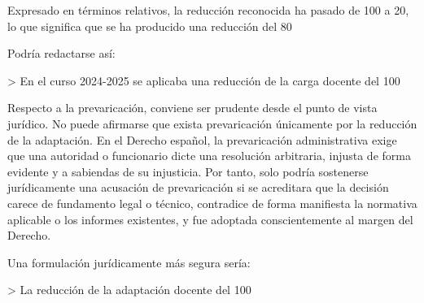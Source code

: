 \begin{itemize}[leftmargin=*, labelsep=0.6em, itemsep=0.8em]
{{{{{{{{{{Expresado en términos relativos, la reducción reconocida ha pasado de 100 a 20, lo que significa que se ha producido una reducción del 80 %

Podría redactarse así:

> En el curso 2024-2025 se aplicaba una reducción de la carga docente del 100 %



Respecto a la prevaricación, conviene ser prudente desde el punto de vista jurídico. No puede afirmarse que exista prevaricación únicamente por la reducción de la adaptación. En el Derecho español, la prevaricación administrativa exige que una autoridad o funcionario dicte una resolución arbitraria, injusta de forma evidente y a sabiendas de su injusticia. Por tanto, solo podría sostenerse jurídicamente una acusación de prevaricación si se acreditara que la decisión carece de fundamento legal o técnico, contradice de forma manifiesta la normativa aplicable o los informes existentes, y fue adoptada conscientemente al margen del Derecho.

Una formulación jurídicamente más segura sería:

> La reducción de la adaptación docente del 100 %


}}}}}}}}}}
\end{itemize}

